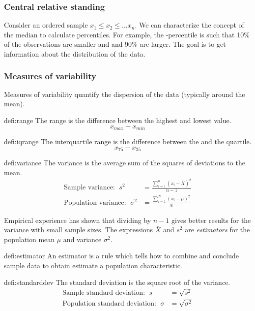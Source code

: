 	\subsubsection{Central relative standing}
		Consider an ordered sample $x_1\leq x_2 \leq ... x_n$. We can characterize the concept of the median to calculate percentiles. For example, the -percentile is such that 10\% of the observations are smaller and and 90\% are larger. The goal is to get information about the distribution of the data.
	\subsubsection{Measures of variability}
		Measures of variability quantify the dispersion of the data (typically around the mean).
		\begin{defi}[Range]{defi:range}
			The range is the difference between the highest and lowest value.
			\begin{equation*}
				x_{max}-x_{min}
			\end{equation*}
		\end{defi}
		\begin{defi}{defi:iqrange}
			The interquartile range is the difference between the  and the  quartile.
			\begin{equation*}
			x_{75}-x_{25}
			\end{equation*}
		\end{defi}
		\begin{defi}[Variance]{defi:variance}
			The variance is the average sum of the squares of deviations to the mean.
			\begin{align*}
				\text{Sample variance: }\;s^2&=\frac{\sum\limits_{i=1}^{n}(x_i-\bar{X})^2}{n-1}\\
				\text{Population variance: }\;\sigma^2&=\frac{\sum\limits_{i=1}^{N}(x_i-\mu)^2}{N}
			\end{align*}
		\end{defi}
		Empirical experience has shown that dividing by $n-1$ gives better results for the variance with small sample sizes. The expressions $\bar{X}$ and $s^2$ are \emph{estimators} for the population mean $\mu$ and variance $\sigma^2$.
		\begin{defi}[Estimator]{defi:estimator}
			An estimator is a rule which tells how to combine and conclude
			sample data to obtain estimate a population characteristic.
		\end{defi}
		\begin{defi}{defi:standarddev}
			The standard deviation is the square root of the variance.
			\begin{align*}
			\text{Sample standard deviation: }\;s&=\sqrt{s^2}\\
			\text{Population standard deviation: }\;\sigma&=\sqrt{\sigma^2}
			\end{align*}
		\end{defi}
